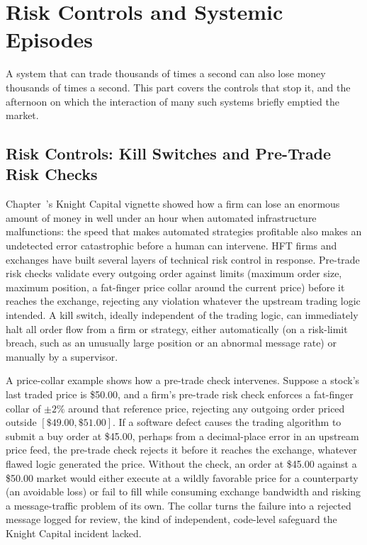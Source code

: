 \documentclass[../ai_in_finance]{subfiles}
\begin{document}
\section{Risk Controls and Systemic Episodes}

A system that can trade thousands of times a second can also lose money thousands of times a second. This part covers the controls that stop it, and the afternoon on which the interaction of many such systems briefly emptied the market.

\subsection{Risk Controls: Kill Switches and Pre-Trade Risk Checks}

Chapter~'s Knight Capital vignette showed how a firm can lose an enormous amount of money in well under an hour when automated infrastructure malfunctions: the speed that makes automated strategies profitable also makes an undetected error catastrophic before a human can intervene. HFT firms and exchanges have built several layers of technical risk control in response. Pre-trade risk checks validate every outgoing order against limits (maximum order size, maximum position, a fat-finger price collar around the current price) before it reaches the exchange, rejecting any violation whatever the upstream trading logic intended. A kill switch, ideally independent of the trading logic, can immediately halt all order flow from a firm or strategy, either automatically (on a risk-limit breach, such as an unusually large position or an abnormal message rate) or manually by a supervisor.

A price-collar example shows how a pre-trade check intervenes. Suppose a stock's last traded price is \$50.00, and a firm's pre-trade risk check enforces a fat-finger collar of $\pm 2\%$ around that reference price, rejecting any outgoing order priced outside $[\$49.00, \$51.00]$. If a software defect causes the trading algorithm to submit a buy order at \$45.00, perhaps from a decimal-place error in an upstream price feed, the pre-trade check rejects it before it reaches the exchange, whatever flawed logic generated the price. Without the check, an order at \$45.00 against a \$50.00 market would either execute at a wildly favorable price for a counterparty (an avoidable loss) or fail to fill while consuming exchange bandwidth and risking a message-traffic problem of its own. The collar turns the failure into a rejected message logged for review, the kind of independent, code-level safeguard the Knight Capital incident lacked.
\end{document}
